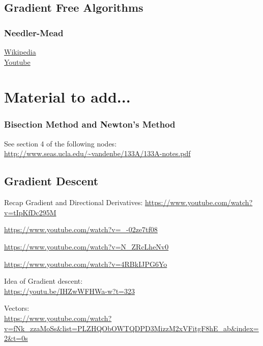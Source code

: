 \documentclass[../open-optimization/open-optimization.tex]{subfiles}
\begin{document}
\section{Gradient Free Algorithms}


\subsection{Needler-Mead}

\href{https://en.wikipedia.org/wiki/Nelder%E2%80%93Mead_method}{Wikipedia}\\
\href{https://youtube/NI3WllrvWoc?t=96}{Youtube}





\chapter{Material to add...}

\subsection{Bisection Method and Newton's Method}
See section 4 of the following nodes:
\url{http://www.seas.ucla.edu/~vandenbe/133A/133A-notes.pdf}

\section{Gradient Descent}
Recap Gradient and Directional Derivatives:
\url{https://www.youtube.com/watch?v=tIpKfDc295M}

\url{https://www.youtube.com/watch?v=_-02ze7tf08}

\url{https://www.youtube.com/watch?v=N_ZRcLheNv0}

\url{https://www.youtube.com/watch?v=4RBkIJPG6Yo}




Idea of Gradient descent:\\
\url{https://youtu.be/IHZwWFHWa-w?t=323}

Vectors:\\
\url{https://www.youtube.com/watch?v=fNk_zzaMoSs&list=PLZHQObOWTQDPD3MizzM2xVFitgF8hE_ab&index=2&t=0s}
\end{document}
